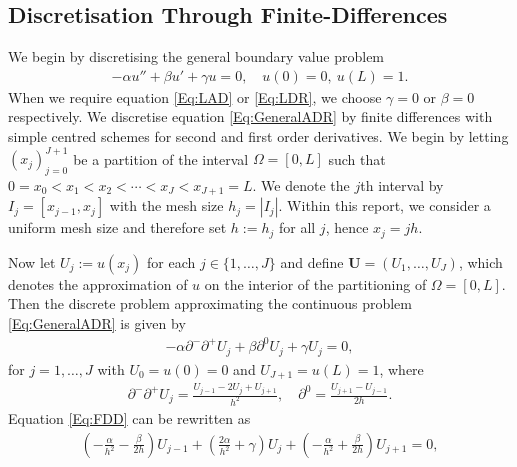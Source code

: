\documentclass[a4paper,11pt]{article}
\theoremstyle{break}
\theoremstyle{break2}
\theoremstyle{break}
\theoremstyle{break2}
\begin{document}
\subsection{Discretisation Through Finite-Differences}
We begin by discretising the general boundary value problem
\begin{align}\label{Eq:GeneralADR}
-\alpha u'' + \beta u' + \gamma u = 0, \quad u(0) = 0,\ u(L) = 1.
\end{align}
When we require equation \eqref{Eq:LAD} or \eqref{Eq:LDR}, we choose $ \gamma = 0 $ or $ \beta = 0 $ respectively. We discretise equation \eqref{Eq:GeneralADR} by finite differences with simple centred schemes for second and first order derivatives. We begin by letting $ (x_j)_{j=0}^{J+1} $ be a partition of the interval $ \Omega = [0,L] $ such that $ 0 = x_0 < x_1 < x_2 < \cdots < x_J < x_{J+1} = L $. We denote the $ j $th interval by $ I_j = [x_{j-1},x_j] $ with the mesh size $ h_j = |I_j| $. Within this report, we consider a uniform mesh size and therefore set $ h := h_j $ for all $ j $, hence $ x_j = jh $.
\begin{figure}[h]
	\centering
\end{figure}
Now let $ U_j := u(x_j) $ for each $ j \in \{1,\ldots,J\} $ and define $ \mathbf{U} = (U_1,\ldots,U_J) $, which denotes the approximation of $ u $ on the interior of the partitioning of $ \Omega = [0,L] $. Then the discrete problem approximating the continuous problem \eqref{Eq:GeneralADR} is given by 
\begin{align}\label{Eq:FDD}
-\alpha\partial^-\partial^+ U_j + \beta \partial^0U_j + \gamma U_j = 0, 
\end{align}
for $ j = 1,\ldots,J $ with $ U_0 = u(0) = 0 $ and $ U_{J+1} = u(L) = 1 $, where
\begin{align*}
\partial^-\partial^+U_j = \frac{U_{j-1} - 2U_j + U_{j+1}}{h^2},\quad \partial^0 = \frac{U_{j+1} - U_{j-1}}{2h}.
\end{align*}
Equation \eqref{Eq:FDD} can be rewritten as
\begin{align*}
\left(-\frac{\alpha}{h^2} - \frac{\beta}{2h}\right)U_{j-1} + \left(\frac{2\alpha}{h^2} + \gamma\right)U_j + \left(-\frac{\alpha}{h^2} + \frac{\beta}{2h}\right)U_{j+1} = 0,
\end{align*}
\end{document}
